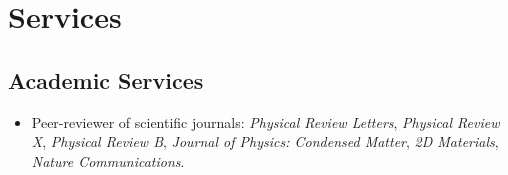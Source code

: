 \section{Services}


\subsection{Academic Services}
\begin{itemize}
\item Peer-reviewer of scientific journals:
      \emph{Physical Review Letters},
      \emph{Physical Review X},
      \emph{Physical Review B},
      \emph{Journal of Physics: Condensed Matter},
      \emph{2D Materials},
      \emph{Nature Communications}.
\end{itemize}